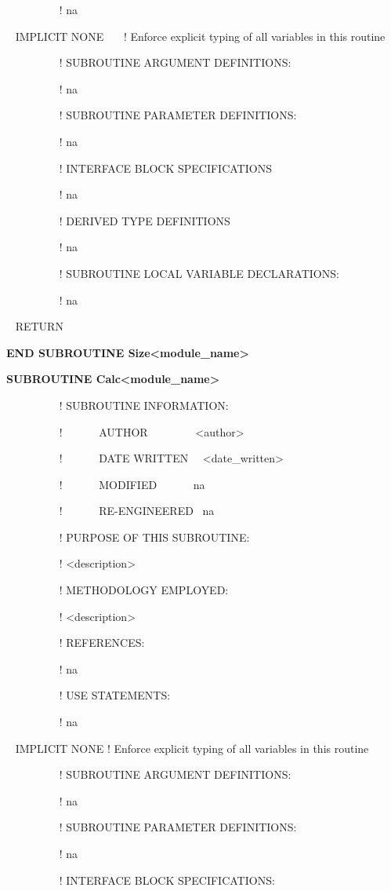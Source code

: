~~~~~~~~~ ! na

~ IMPLICIT NONE~~~ ! Enforce explicit typing of all variables in this routine

~~~~~~~~~ ! SUBROUTINE ARGUMENT DEFINITIONS:

~~~~~~~~~ ! na

~~~~~~~~~ ! SUBROUTINE PARAMETER DEFINITIONS:

~~~~~~~~~ ! na

~~~~~~~~~ ! INTERFACE BLOCK SPECIFICATIONS

~~~~~~~~~ ! na

~~~~~~~~~ ! DERIVED TYPE DEFINITIONS

~~~~~~~~~ ! na

~~~~~~~~~ ! SUBROUTINE LOCAL VARIABLE DECLARATIONS:

~~~~~~~~~ ! na

~ RETURN

\textbf{END SUBROUTINE Size\textless{}module\_name\textgreater{}}

\textbf{SUBROUTINE Calc\textless{}module\_name\textgreater{}}

~~~~~~~~~ ! SUBROUTINE INFORMATION:

~~~~~~~~~ !~~~~~~ AUTHOR~~~~~~~~ \textless{}author\textgreater{}

~~~~~~~~~ !~~~~~~ DATE WRITTEN~~ \textless{}date\_written\textgreater{}

~~~~~~~~~ !~~~~~~ MODIFIED~~~~~~ na

~~~~~~~~~ !~~~~~~ RE-ENGINEERED~ na

~~~~~~~~~ ! PURPOSE OF THIS SUBROUTINE:

~~~~~~~~~ ! \textless{}description\textgreater{}

~~~~~~~~~ ! METHODOLOGY EMPLOYED:

~~~~~~~~~ ! \textless{}description\textgreater{}

~~~~~~~~~ ! REFERENCES:

~~~~~~~~~ ! na

~~~~~~~~~ ! USE STATEMENTS:

~~~~~~~~~ ! na

~ IMPLICIT NONE ! Enforce explicit typing of all variables in this routine

~~~~~~~~~ ! SUBROUTINE ARGUMENT DEFINITIONS:

~~~~~~~~~ ! na

~~~~~~~~~ ! SUBROUTINE PARAMETER DEFINITIONS:

~~~~~~~~~ ! na

~~~~~~~~~ ! INTERFACE BLOCK SPECIFICATIONS:

